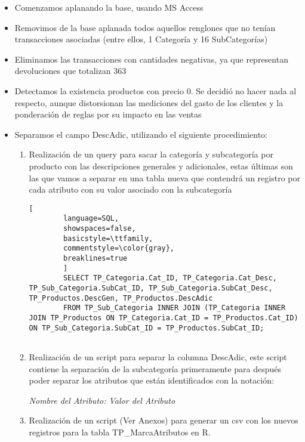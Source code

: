 \documentclass[]{article}
\begin{document}
\begin{itemize}
	\item Comenzamos aplanando la base, usando MS Access
	\item Removimos de la base aplanada todos aquellos renglones que no tenían transacciones asociadas (entre ellos, 1 Categoría y 16 SubCategorías)
	\item Eliminamos las transacciones con cantidades negativas, ya que representan devoluciones que totalizan 363
	\item Detectamos la existencia productos con precio 0. Se decidió no hacer nada al respecto, aunque distorsionan las mediciones del gasto de los clientes y la ponderación de reglas por su impacto en las ventas
	\item Separamos el campo DescAdic, utilizando el siguiente procedimiento:
	\begin{enumerate}
		\item Realización de un query para sacar la categoría y subcategoría por producto con las descripciones generales y adicionales, estas últimas son las que vamos a separar en una tabla nueva que contendrá un registro por cada atributo con su valor asociado con la subcategoría
		
		\begin{lstlisting}[
		language=SQL,
		showspaces=false,
		basicstyle=\ttfamily,
		commentstyle=\color{gray},
		breaklines=true
		]
		SELECT TP_Categoria.Cat_ID, TP_Categoria.Cat_Desc, TP_Sub_Categoria.SubCat_ID, TP_Sub_Categoria.SubCat_Desc, TP_Productos.DescGen, TP_Productos.DescAdic
		FROM TP_Sub_Categoria INNER JOIN (TP_Categoria INNER JOIN TP_Productos ON TP_Categoria.Cat_ID = TP_Productos.Cat_ID) ON TP_Sub_Categoria.SubCat_ID = TP_Productos.SubCat_ID;
		
		\end{lstlisting}
		
		\item Realización de un script para separar la columna DescAdic, este script contiene la separación de la subcategoría primeramente para después poder separar los atributos que están identificados con la notación:\\
		\begin{center}
			\textit{Nombre del Atributo: Valor del Atributo}		
		\end{center}
		
		\item Realización de un script (Ver Anexos) para generar un csv con los nuevos registros para la tabla TP\_MarcaAtributos en R.\\
		

\end{enumerate}
\end{itemize}
\end{document}
